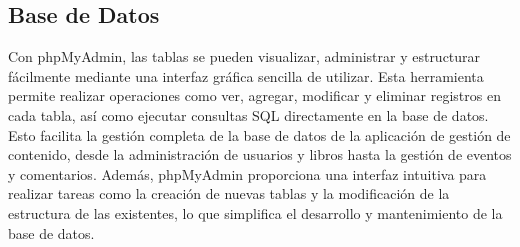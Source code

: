 \documentclass[a4paper, 12pt]{book}
\begin{document}
\subsection{Base de Datos}
\label{sec:base_datos}
Con phpMyAdmin, las tablas se pueden visualizar, administrar y estructurar fácilmente mediante una interfaz gráfica sencilla de utilizar.
Esta herramienta permite realizar operaciones como ver, agregar, modificar y eliminar registros en cada tabla, así como 
ejecutar consultas SQL directamente en la base de datos. Esto facilita la gestión completa de la base de datos de la aplicación 
de gestión de contenido, desde la administración de usuarios y libros hasta la gestión de eventos y comentarios. Además, phpMyAdmin 
proporciona una interfaz intuitiva para realizar tareas como la creación de nuevas tablas y la modificación de la estructura de 
las existentes, lo que simplifica el desarrollo y mantenimiento de la base de datos.
\end{document}
